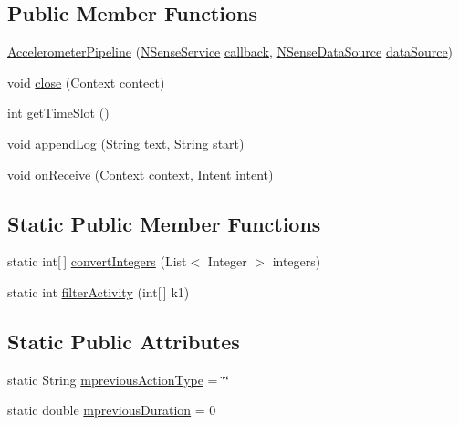 \subsection*{Public Member Functions}
\begin{DoxyCompactItemize}
\item 
\hyperlink{classcs_1_1nsense_1_1accelerometer_1_1_accelerometer_pipeline_ad92c55698c9ffbd4daac42870e64c245}{Accelerometer\-Pipeline} (\hyperlink{classcs_1_1nsense_1_1_n_sense_service}{N\-Sense\-Service} \hyperlink{classcs_1_1nsense_1_1accelerometer_1_1_accelerometer_pipeline_a73c0b64e76b97c8e5246c7a0fae0b088}{callback}, \hyperlink{classcs_1_1nsense_1_1db_1_1_n_sense_data_source}{N\-Sense\-Data\-Source} \hyperlink{classcs_1_1nsense_1_1accelerometer_1_1_accelerometer_pipeline_a3d136e7961ce5ead1331d809aa30d41e}{data\-Source})
\item 
void \hyperlink{classcs_1_1nsense_1_1accelerometer_1_1_accelerometer_pipeline_acdaf7d5fea068932ab6b4a89ae0d654d}{close} (Context contect)
\item 
int \hyperlink{classcs_1_1nsense_1_1accelerometer_1_1_accelerometer_pipeline_a4be2897a6c326811204f44fe5b3b9567}{get\-Time\-Slot} ()
\item 
void \hyperlink{classcs_1_1nsense_1_1accelerometer_1_1_accelerometer_pipeline_a2c2bf20732edef1bcb592940ebef81cb}{append\-Log} (String text, String start)
\item 
void \hyperlink{classcs_1_1nsense_1_1accelerometer_1_1_accelerometer_pipeline_ab39678d59996098218331035a47b4567}{on\-Receive} (Context context, Intent intent)
\end{DoxyCompactItemize}
\subsection*{Static Public Member Functions}
\begin{DoxyCompactItemize}
\item 
static int\mbox{[}$\,$\mbox{]} \hyperlink{classcs_1_1nsense_1_1accelerometer_1_1_accelerometer_pipeline_a9b9d469c27e5792d1357b5ab3fefac77}{convert\-Integers} (List$<$ Integer $>$ integers)
\item 
static int \hyperlink{classcs_1_1nsense_1_1accelerometer_1_1_accelerometer_pipeline_a112a71106c913453b4b6b284ae1da3c7}{filter\-Activity} (int\mbox{[}$\,$\mbox{]} k1)
\end{DoxyCompactItemize}
\subsection*{Static Public Attributes}
\begin{DoxyCompactItemize}
\item 
static String \hyperlink{classcs_1_1nsense_1_1accelerometer_1_1_accelerometer_pipeline_ab6e833e25be760387c8431d3a62cc392}{mprevious\-Action\-Type} = \char`\"{}\char`\"{}
\item 
static double \hyperlink{classcs_1_1nsense_1_1accelerometer_1_1_accelerometer_pipeline_a7fe243bb6109305b49f8ef577025cf8f}{mprevious\-Duration} = 0
\end{DoxyCompactItemize}
